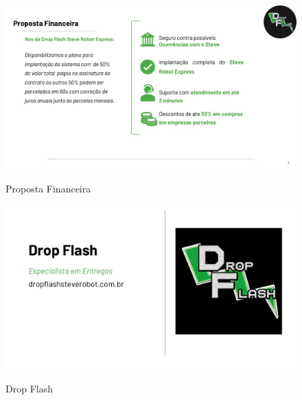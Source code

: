 \begin{figure} [!ht]
    \centering
    \caption{Proposta Financeira}
    \includegraphics[width=1.0\linewidth]{figuras/mark6.jpeg}
    \label{fig:enter-label}
\end{figure}

\begin{figure} [!ht]
    \centering
    \caption{Drop Flash}
    \includegraphics[width=1.0\linewidth]{figuras/mark7.jpeg}
    \label{fig:enter-label}
\end{figure}